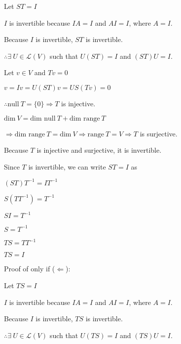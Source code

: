 \documentclass[fleqn]{article}
\begin{document}
\begin{enumerate}[nolistsep]
	Let $ST = I$
	
	$I$ is invertible because $IA = I$ and $AI = I$, where $A = I$.
	
	Because $I$ is invertible, $ST$ is invertible.
	
	$\therefore \exists\ U \in \mathcal{L}(V)$ such that $U(ST) = I$ and $(ST)U = I$.
	
	Let $v \in V$ and $Tv = 0$
	
	$v = Iv = U(ST)v = US(Tv) = 0$
	
	$\therefore \text{null}\ T = \{0\} \Rightarrow T$ is injective.
	
	$\text{dim}\ V = \text{dim null}\ T + \text{dim range}\ T$
	
	$\Rightarrow \text{dim range}\ T = \text{dim}\ V \Rightarrow \text{range}\ T = V \Rightarrow T$ is surjective. 
	
	Because $T$ is injective and surjective, it is invertible.
	
	
	
	
	
	
	
	
	
	Since $T$ is invertible, we can write $ST = I$ as
	
	$(ST)T^{-1} = IT^{-1}$
	
	$S(TT^{-1}) = T^{-1}$
	
	$SI = T^{-1}$
	
	$S = T^{-1}$
	
	$TS = TT^{-1}$
	
	$TS = I$
	
	Proof of only if ($\Leftarrow$):
	
	Let $TS = I$
	
	$I$ is invertible because $IA = I$ and $AI = I$, where $A = I$.
	
	Because $I$ is invertible, $TS$ is invertible.
	
	$\therefore \exists\ U \in \mathcal{L}(V)$ such that $U(TS) = I$ and $(TS)U = I$.
	

\end{enumerate}
\end{document}
